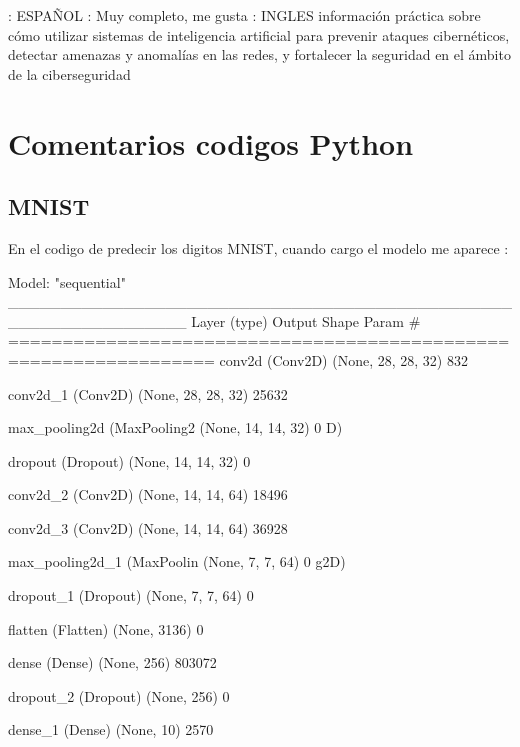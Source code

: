 \documentclass[11pt, a4paper]{article} %
\begin{document}
\citep{olabe1998redes} : ESPAÑOL : Muy completo, me gusta
\citep{parisi2019hands} : INGLES información práctica sobre cómo utilizar sistemas de inteligencia artificial para prevenir ataques cibernéticos, detectar amenazas y anomalías en las redes, y fortalecer la seguridad en el ámbito de la ciberseguridad


\section{Comentarios codigos Python}

\subsection{MNIST}

En el codigo de predecir los digitos MNIST, cuando cargo el modelo me aparece :

Model: "sequential"
_________________________________________________________________
 Layer (type)                Output Shape              Param #   
=================================================================
 conv2d (Conv2D)             (None, 28, 28, 32)        832       

 conv2d_1 (Conv2D)           (None, 28, 28, 32)        25632

 max_pooling2d (MaxPooling2  (None, 14, 14, 32)        0
 D)

 dropout (Dropout)           (None, 14, 14, 32)        0

 conv2d_2 (Conv2D)           (None, 14, 14, 64)        18496

 conv2d_3 (Conv2D)           (None, 14, 14, 64)        36928

 max_pooling2d_1 (MaxPoolin  (None, 7, 7, 64)          0
 g2D)

 dropout_1 (Dropout)         (None, 7, 7, 64)          0

 flatten (Flatten)           (None, 3136)              0

 dense (Dense)               (None, 256)               803072

 dropout_2 (Dropout)         (None, 256)               0

 dense_1 (Dense)             (None, 10)                2570
\end{document}

